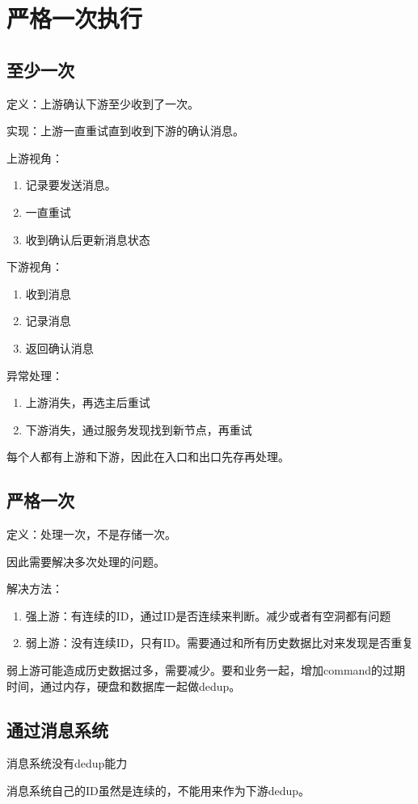 \chapter{严格一次执行}




\section{至少一次}
定义：上游确认下游至少收到了一次。


实现：上游一直重试直到收到下游的确认消息。

上游视角：
\begin{enumerate}
    \item 记录要发送消息。
    \item 一直重试
    \item 收到确认后更新消息状态
\end{enumerate}


下游视角：
\begin{enumerate}
    \item 收到消息
    \item 记录消息
    \item 返回确认消息
\end{enumerate}



异常处理：
\begin{enumerate}
    \item 上游消失，再选主后重试
    \item 下游消失，通过服务发现找到新节点，再重试
\end{enumerate}


每个人都有上游和下游，因此在入口和出口先存再处理。

\section{严格一次}
定义：处理一次，不是存储一次。

因此需要解决多次处理的问题。

解决方法：
\begin{enumerate}
    \item 强上游：有连续的ID，通过ID是否连续来判断。减少或者有空洞都有问题
    \item 弱上游：没有连续ID，只有ID。需要通过和所有历史数据比对来发现是否重复
\end{enumerate}


弱上游可能造成历史数据过多，需要减少。要和业务一起，增加command的过期时间，通过内存，硬盘和数据库一起做dedup。

\section{通过消息系统}
消息系统没有dedup能力

消息系统自己的ID虽然是连续的，不能用来作为下游dedup。
